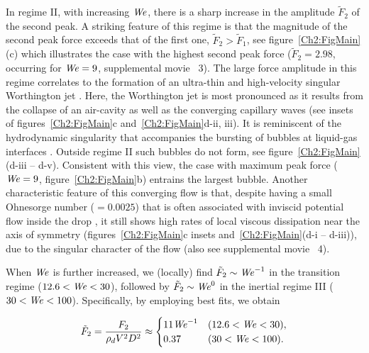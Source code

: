 In regime II, with increasing $\mathit{We}$, there is a sharp increase in the amplitude $\tilde{F}_2$ of the second peak. A striking feature of this regime is that the magnitude of the second peak force exceeds that of the first one, $\tilde{F}_2 > \tilde{F}_1$, see figure~\ref{Ch2:FigMain}(c) which  illustrates the case with the highest second peak force ($\tilde{F}_2 = 2.98$, occurring  for $\mathit{We} = 9$, supplemental movie~{\color{Myfig} 3}). The large force amplitude in this regime correlates to the formation of an ultra-thin and high-velocity singular Worthington jet \cite{bartolo2006singular}. Here, the Worthington jet is most pronounced as it results from the collapse of an air-cavity as well as the converging capillary waves (see insets of figures~\ref{Ch2:FigMain}c and~\ref{Ch2:FigMain}d-ii, iii). It is reminiscent of the hydrodynamic singularity that accompanies the bursting of bubbles at liquid-gas interfaces \cite[see \S~{chap:BurstingBubbleVP} and][]{woodcock1953giant, sanjay_lohse_jalaal_2021}. Outside regime II such bubbles do not form, see figure~\ref{Ch2:FigMain}(d-iii -- d-v). Consistent with this view, the case with maximum peak force ($\mathit{We} = 9$, figure~\ref{Ch2:FigMain}b) entrains the largest bubble. Another characteristic feature of this converging flow is that, despite having a small Ohnesorge number ($= 0.0025$) that is often associated with inviscid potential flow inside the drop \cite{molavcek2012quasi}, it still shows high rates of local viscous dissipation near the axis of symmetry (figures~\ref{Ch2:FigMain}c insets and~\ref{Ch2:FigMain}(d-i -- d-iii)), due to the singular character of the flow (also see supplemental movie~{\color{Myfig} 4}).  

When $\mathit{We}$ is further increased, we (locally) find $\tilde{F}_2 \sim \mathit{We}^{-1}$ in the transition regime ($12.6 < \mathit{We} < 30$), followed by $\tilde{F}_2 \sim \mathit{We}^0$ in the inertial regime III ($30 < \mathit{We} < 100$). Specifically, by employing best fits, we obtain

\begin{equation}
	\tilde F_2 = \frac{F_2}{\rho_d V^2 D^2} \approx
	\begin{cases}
		11\mathit{We}^{-1} &(12.6 < \mathit{We} < 30),\\
		0.37 &(30 < \mathit{We} < 100).
	\end{cases}
	\label{Ch2:Eqn1}
\end{equation}

